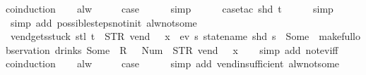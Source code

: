 \begin{isabellebody}
\isamarkupfalse%
{\isacharparenleft}coinduction{\isacharparenright}\isanewline
\ \ \isamarkupfalse%
\ alw\isanewline
\ \ \isamarkupfalse%
\ \isamarkupfalse%
\ {\isacharquery}case\isanewline
\ \ \ \ \isamarkupfalse%
\ simp\isanewline
\ \ \ \ \isamarkupfalse%
\ {\isacharparenleft}case{\isacharunderscore}tac\ {\isachardoublequoteopen}shd\ t{\isachardoublequoteclose}{\isacharparenright}\isanewline
\ \ \ \ \isamarkupfalse%
\ simp\isanewline
\ \ \ \ \isamarkupfalse%
\ {\isacharparenleft}simp\ add{\isacharcolon}\ possible{\isacharunderscore}steps{\isacharunderscore}not{\isacharunderscore}init\ alw{\isacharunderscore}not{\isacharunderscore}some{\isacharparenright}\isanewline
{}\isamarkupfalse%
%
\endisatagproof
{\isafoldproof}%
%
\isadelimproof
\isanewline
%
\endisadelimproof
\isanewline
{}\isamarkupfalse%
\ vend{\isacharunderscore}gets{\isacharunderscore}stuck{\isacharcolon}\ {\isachardoublequoteopen}stl\ t\ {\isacharequal}\ {\isacharparenleft}STR\ {\isacharprime}{\isacharprime}vend{\isacharprime}{\isacharprime}{\isacharcomma}\ {\isacharbrackleft}{\isacharbrackright}{\isacharparenright}\ {\isacharhash}{\isacharhash}\ x{}\ {\isasymLongrightarrow}\ {\isasymnot}ev\ {\isacharparenleft}{\isasymlambda}s{\isachardot}\ statename\ {\isacharparenleft}shd\ s{\isacharparenright}\ {\isacharequal}\ Some\ {}{\isacharparenright}\ {\isacharparenleft}make{\isacharunderscore}full{\isacharunderscore}observation\ drinks\ {\isacharparenleft}Some\ {}{\isacharparenright}\ {\isacharless}R\ {}\ {\isacharcolon}{\isacharequal}\ Num\ {}{\isachargreater}\ {\isacharparenleft}{\isacharparenleft}STR\ {\isacharprime}{\isacharprime}vend{\isacharprime}{\isacharprime}{\isacharcomma}\ {\isacharbrackleft}{\isacharbrackright}{\isacharparenright}\ {\isacharhash}{\isacharhash}\ x{}{\isacharparenright}{\isacharparenright}{\isachardoublequoteclose}\isanewline
%
\isadelimproof
\ \ %
\endisadelimproof
%
\isatagproof
{}\isamarkupfalse%
\ {\isacharparenleft}simp\ add{\isacharcolon}\ not{\isacharunderscore}ev{\isacharunderscore}iff{\isacharparenright}\isanewline
{}\isamarkupfalse%
{\isacharparenleft}coinduction{\isacharparenright}\isanewline
\ \ \isamarkupfalse%
\ alw\isanewline
\ \ \isamarkupfalse%
\ \isamarkupfalse%
\ {\isacharquery}case\isanewline
\ \ \ \ \isamarkupfalse%
\ {\isacharparenleft}simp\ add{\isacharcolon}\ vend{\isacharunderscore}insufficient\ alw{\isacharunderscore}not{\isacharunderscore}some{\isacharparenright}\isanewline

\end{isabellebody}
